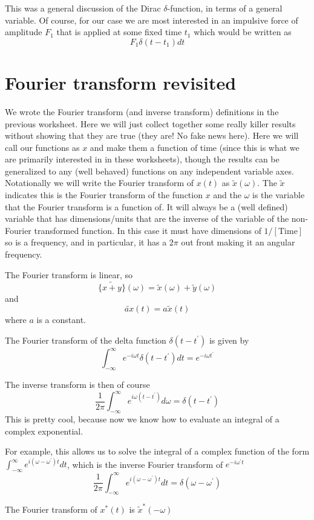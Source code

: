 \documentclass[]{revtex4}
\newcommand{\sm}[1]{{\[#1\]}}
\begin{document}
This was a general discussion of the Dirac $\delta$-function, in terms of a general variable. Of course, for our case we are most interested in
an impulsive force of amplitude $F_1$ that is applied at some fixed time $t_1$ which would be written as
\sm{F_1\delta(t-t_1)dt}

\section*{Fourier transform revisited}
We wrote the Fourier transform (and inverse transform) definitions in the previous worksheet.  Here we will just collect together some
really killer results without showing that they are true (they are!  No fake news here).
Here we will call our functions as $x$ and make them a function of time (since this is what we are primarily interested in in these worksheets), though the
results can be generalized to any (well behaved) functions on any independent variable axes.  Notationally we will write the Fourier transform of
$x(t)$ as $\tilde{x}(\omega)$.  The $\tilde{x}$ indicates this is the Fourier transform of the function $x$ and the $\omega$ is the variable
that the Fourier transform is a function of.  It will always be a (well defined) variable that has dimensions/units that are the inverse of the variable
of the non-Fourier transformed function.  In this case it must have dimensions of $1/[\mathrm{Time}]$ so is a frequency, and in particular, it
has a $2\pi$ out front making it an angular frequency.
\bi
\item The Fourier transform is linear, so
\sm{\tilde{\{x+y\}}(\omega)= \tilde{x}(\omega)+\tilde{y}(\omega)}
and
\sm{\tilde{ax}(t) = a\tilde{x}(t)}
where $a$ is a constant.
\item The Fourier transform of the delta function $\delta (t-t^\prime)$ is given by
\sm{\int_{-\infty}^\infty e^{-i\omega t}\delta(t-t^\prime)dt = e^{-i\omega t^\prime}}
\item The inverse transform is then of course \sm{\frac{1}{2\pi}\int_{-\infty}^\infty e^{i\omega (t-t^\prime)}d\omega = \delta(t-t^\prime)}
This is pretty cool, because now we know how to evaluate an integral of a complex exponential.
\item For example, this allows us to solve the integral of a complex function of the form $\int_{-\infty}^\infty e^{i(\omega-\omega^\prime)t} dt$,
which is the inverse Fourier transform of $e^{-i\omega^\prime t}$
\sm{\frac{1}{2\pi}\int_{-\infty}^\infty e^{i(\omega-\omega^\prime)t} dt  = \delta(\omega-\omega^\prime)}
\item The Fourier transform of $x^*(t)$ is $\tilde{x}^*(-\omega)$
\end{document}
